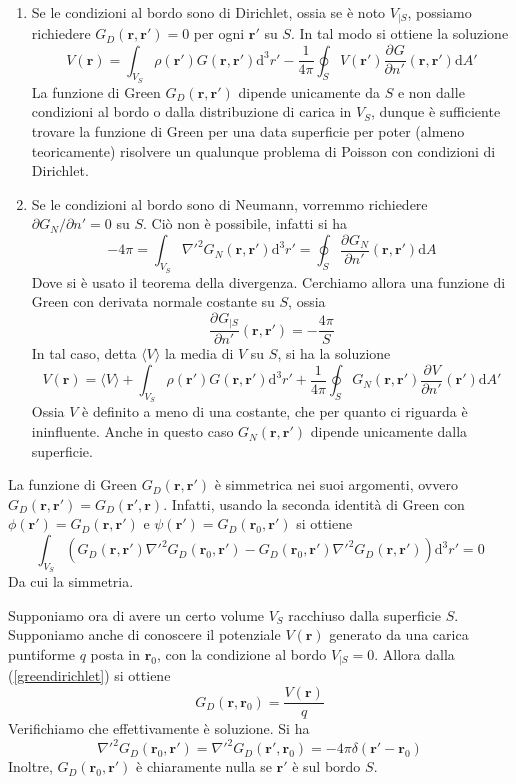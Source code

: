 \documentclass[a4paper,11pt]{book}
\newcommand{\dif}{\mathrm{d}}
\newcommand{\der}[3][]{\frac{\partial ^{#1}#2}{\partial {#3}^{#1}}}
\let\oldnabla\nabla
\renewcommand{\nabla}{\vec{\oldnabla}}
\renewcommand{\vec}[1]{\mathbf{#1}}
\theoremstyle{theorem}
\theoremstyle{definition}
\begin{document}
\begin{enumerate}
	\item Se le condizioni al bordo sono di Dirichlet, ossia se è noto $V_{|S}$, possiamo richiedere $G_D(\vec{r},\vec{r}')=0$ per ogni $\vec{r}'$ su $S$. In tal modo si ottiene la soluzione
	\begin{equation}
	\label{greendirichlet}
	V(\vec{r})=\int_{V_S}\rho(\vec{r}')G(\vec{r},\vec{r}')\dif^3r'-\frac{1}{4\pi}\oint_SV(\vec{r}')\der{G}{n'}(\vec{r},\vec{r}')\dif A'
	\end{equation}
	La funzione di Green $G_D(\vec{r},\vec{r}')$ dipende unicamente da $S$ e non dalle condizioni al bordo o dalla distribuzione di carica in $V_S$, dunque è sufficiente trovare la funzione di Green per una data superficie per poter (almeno teoricamente) risolvere un qualunque problema di Poisson con condizioni di Dirichlet.
	\item Se le condizioni al bordo sono di Neumann, vorremmo richiedere $\partial G_N/\partial n'=0$ su $S$. Ciò non è possibile, infatti si ha
	\[
		-4\pi=\int_{V_S}\oldnabla'^2G_N(\vec{r},\vec{r}')\dif^3r'=\oint_S\der{G_N}{n'}(\vec{r},\vec{r}')\dif A
	\]
	Dove si è usato il teorema della divergenza. Cerchiamo allora una funzione di Green con derivata normale costante su $S$, ossia
	\[
		\der{G_{|S}}{n'}(\vec{r},\vec{r}')=-\frac{4\pi}{S}
	\]
	In tal caso, detta $\langle V\rangle$ la media di $V$ su $S$, si ha la soluzione
	\begin{equation}
	\label{grennneumann}
		V(\vec{r})=\langle V\rangle+\int_{V_S}\rho(\vec{r}')G(\vec{r},\vec{r}')\dif^3r'+\frac{1}{4\pi}\oint_SG_N(\vec{r},\vec{r}')\der{V}{n'}(\vec{r}')\dif A'
	\end{equation}
	Ossia $V$ è definito a meno di una costante, che per quanto ci riguarda è ininfluente. Anche in questo caso $G_N(\vec{r},\vec{r}')$ dipende unicamente dalla superficie.
\end{enumerate}
La funzione di Green $G_D(\vec{r},\vec{r}')$ è simmetrica nei suoi argomenti, ovvero $G_D(\vec{r},\vec{r}')=G_D(\vec{r}',\vec{r})$. Infatti, usando la seconda identità di Green con $\phi(\vec{r}')=G_D(\vec{r},\vec{r}')$ e $\psi(\vec{r}')=G_D(\vec{r}_0,\vec{r}')$ si ottiene
\[
	\int_{V_S}\left(G_D(\vec{r},\vec{r}')\oldnabla'^2G_D(\vec{r}_0,\vec{r}')-G_D(\vec{r}_0,\vec{r}')\oldnabla'^2G_D(\vec{r},\vec{r}')\right)\dif^3r'=0
\]
Da cui la simmetria.

Supponiamo ora di avere un certo volume $V_S$ racchiuso dalla superficie $S$. Supponiamo anche di conoscere il potenziale $V(\vec{r})$ generato da una carica puntiforme $q$ posta in $\vec{r}_0$, con la condizione al bordo $V_{|S}=0$. Allora dalla (\ref{greendirichlet}) si ottiene
\[
	G_D(\vec{r},\vec{r}_0)=\frac{V(\vec{r})}{q}
\]
Verifichiamo che effettivamente è soluzione. Si ha
\[
	\oldnabla'^2G_D(\vec{r}_0,\vec{r}')=\oldnabla'^2G_D(\vec{r}',\vec{r}_0)=-4\pi\delta(\vec{r}'-\vec{r}_0)
\]
Inoltre, $G_D(\vec{r}_0,\vec{r}')$ è chiaramente nulla se $\vec{r}'$ è sul bordo $S$.
\end{document}
